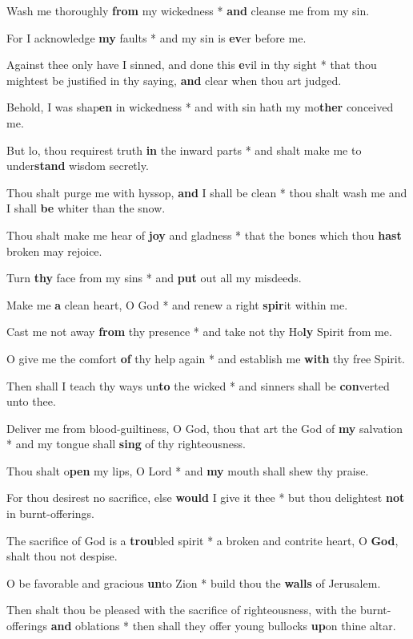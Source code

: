 \begin{multicols}{2}
	Wash me thoroughly \textbf{from} my wickedness * \textbf{and} cleanse me from my sin.
	
	For I acknowledge \textbf{my} faults * and my sin is \textbf{ev}er before me.
	
	Against thee only have I sinned, and done this \textbf{e}vil in thy sight * that thou mightest be justified in thy saying, \textbf{and} clear when thou art judged.
	
	Behold, I was shap\textbf{en} in wickedness * and with sin hath my mo\textbf{ther} conceived me.
	
	But lo, thou requirest truth \textbf{in} the inward parts * and shalt make me to under\textbf{stand} wisdom secretly.
	
	Thou shalt purge me with hyssop, \textbf{and} I shall be clean * thou shalt wash me and I shall \textbf{be} whiter than the snow.
	
	Thou shalt make me hear of \textbf{joy} and gladness * that the bones which thou \textbf{hast} broken may rejoice.
	
	Turn \textbf{thy} face from my sins * and \textbf{put} out all my misdeeds.
	
	Make me \textbf{a} clean heart, O God * and renew a right \textbf{spir}it within me.
	
	Cast me not away \textbf{from} thy presence * and take not thy Ho\textbf{ly} Spirit from me.
	
	O give me the comfort \textbf{of} thy help again * and establish me \textbf{with} thy free Spirit.
	
	Then shall I teach thy ways un\textbf{to} the wicked * and sinners shall be \textbf{con}verted unto thee.
	
	Deliver me from blood-guiltiness, O God, thou that art the God of \textbf{my} salvation * and my tongue shall \textbf{sing} of thy righteousness.
	
	Thou shalt o\textbf{pen} my lips, O Lord * and \textbf{my} mouth shall shew thy praise.
	
	For thou desirest no sacrifice, else \textbf{would} I give it thee * but thou delightest \textbf{not} in burnt-offerings.
	
	The sacrifice of God is a \textbf{trou}bled spirit * a broken and contrite heart, O \textbf{God}, shalt thou not despise.
	
	O be favorable and gracious \textbf{un}to Zion * build thou the \textbf{walls} of Jerusalem.
	
	Then shalt thou be pleased with the sacrifice of righteousness, with the burnt-offerings \textbf{and} oblations * then shall they offer young bullocks \textbf{up}on thine altar.
\end{multicols}
